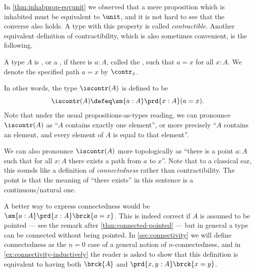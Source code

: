 %
%

In \cref{thm:inhabprop-eqvunit} we observed that a mere proposition which is inhabited must be equivalent to $\unit$,
%
and it is not hard to see that the converse also holds.
A type with this property is called \emph{contractible}.
Another equivalent definition of contractibility, which is also sometimes convenient, is the following.

\begin{defn}\label{defn:contractible}
  A type $A$ is ,
  or a ,
  if there is $a:A$, called the ,
  such that $a=x$ for all $x:A$.
  We denote the specified path $a=x$ by $\contr_x$.
\end{defn}

In other words, the type $\iscontr(A)$ is defined to be
\[ \iscontr(A) \defeq \sm{a:A} \prd{x:A}(a=x). \]
Note that under the usual propositions-as-types reading, we can pronounce $\iscontr(A)$ as ``$A$ contains exactly one element'', or more precisely ``$A$ contains an element, and every element of $A$ is equal to that element''.

\begin{rmk}
  We can also pronounce $\iscontr(A)$ more topologically as ``there is a point $a:A$ such that for all $x:A$ there exists a path from $a$ to $x$''.
  Note that to a classical ear, this sounds like a definition of \emph{connectedness} rather than contractibility.
  The point is that the meaning of ``there exists'' in this sentence is a continuous/natural one.

  A better way to express connectedness would be $\sm{a:A}\prd{x:A} \brck{a=x}$.
  This is indeed correct if $A$ is assumed to be pointed --- see the remark after \cref{thm:connected-pointed} --- but in general a type can be connected without being pointed.
  In \cref{sec:connectivity} we will define connectedness as the $n=0$ case of a general notion of $n$-connectedness, and in \cref{ex:connectivity-inductively} the reader is asked to show that this definition is equivalent to having both $\brck{A}$ and $\prd{x,y:A} \brck{x=y}$.
\end{rmk}

